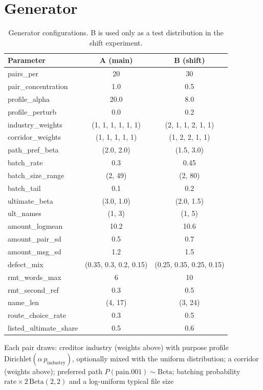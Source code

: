 \documentclass[conference]{IEEEtran}
\begin{document}
\section{Generator}
\begin{table}[h]\caption{Generator configurations. B is used only as a test distribution in the shift experiment.}\label{tab:gen}\centering\scriptsize
\begin{tabularx}{\columnwidth}{@{}Xcc@{}}\toprule
Parameter & A (main) & B (shift) \\\midrule
pairs\_per & 20 & 30 \\
pair\_concentration & 1.0 & 0.5 \\
profile\_alpha & 20.0 & 8.0 \\
profile\_perturb & 0.0 & 0.2 \\
industry\_weights & (1, 1, 1, 1, 1, 1) & (2, 1, 1, 2, 1, 1) \\
corridor\_weights & (1, 1, 1, 1, 1) & (1, 2, 2, 1, 1) \\
path\_pref\_beta & (2.0, 2.0) & (1.5, 3.0) \\
batch\_rate & 0.3 & 0.45 \\
batch\_size\_range & (2, 49) & (2, 80) \\
batch\_tail & 0.1 & 0.2 \\
ultimate\_beta & (3.0, 1.0) & (2.0, 1.5) \\
ult\_names & (1, 3) & (1, 5) \\
amount\_logmean & 10.2 & 10.6 \\
amount\_pair\_sd & 0.5 & 0.7 \\
amount\_msg\_sd & 1.2 & 1.5 \\
defect\_mix & (0.35, 0.3, 0.2, 0.15) & (0.25, 0.35, 0.25, 0.15) \\
rmt\_words\_max & 6 & 10 \\
rmt\_second\_ref & 0.3 & 0.5 \\
name\_len & (4, 17) & (3, 24) \\
route\_choice\_rate & 0.3 & 0.5 \\
listed\_ultimate\_share & 0.5 & 0.6 \\
\bottomrule\end{tabularx}\end{table}
Each pair draws: creditor industry (weights above) with purpose profile
$\mathrm{Dirichlet}(\alpha\,p_{\mathrm{industry}})$, optionally mixed with the
uniform distribution; a corridor (weights above); preferred path
$P(\text{pain.001})\sim\mathrm{Beta}$; batching probability
$\text{rate}\times 2\,\mathrm{Beta}(2,2)$ and a log-uniform typical file size
\end{document}
